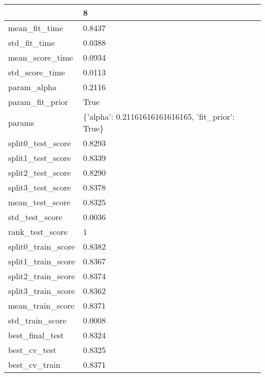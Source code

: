 \begin{tabular}{ll}
\toprule
{} &                                                  8 \\
\midrule
mean\_fit\_time      &                                             0.8437 \\
std\_fit\_time       &                                             0.0388 \\
mean\_score\_time    &                                             0.0934 \\
std\_score\_time     &                                             0.0113 \\
param\_alpha        &                                             0.2116 \\
param\_fit\_prior    &                                               True \\
params             &  \{'alpha': 0.21161616161616165, 'fit\_prior': True\} \\
split0\_test\_score  &                                             0.8293 \\
split1\_test\_score  &                                             0.8339 \\
split2\_test\_score  &                                             0.8290 \\
split3\_test\_score  &                                             0.8378 \\
mean\_test\_score    &                                             0.8325 \\
std\_test\_score     &                                             0.0036 \\
rank\_test\_score    &                                                  1 \\
split0\_train\_score &                                             0.8382 \\
split1\_train\_score &                                             0.8367 \\
split2\_train\_score &                                             0.8374 \\
split3\_train\_score &                                             0.8362 \\
mean\_train\_score   &                                             0.8371 \\
std\_train\_score    &                                             0.0008 \\
best\_final\_test    &                                             0.8324 \\
best\_cv\_test       &                                             0.8325 \\
best\_cv\_train      &                                             0.8371 \\
\bottomrule
\end{tabular}
